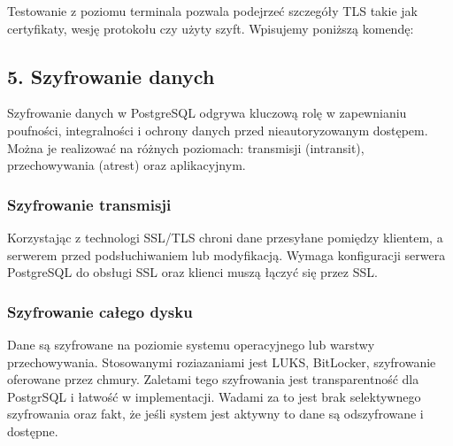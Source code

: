 \documentclass[a4paper,11pt,openany,english]{sphinxmanual}
\begin{document}
\begin{sphinxVerbatim}[commandchars=\\\{\}]
      
 
     
  
\end{sphinxVerbatim}

\sphinxAtStartPar
Testowanie z poziomu terminala pozwala podejrzeć szczegóły TLS takie jak certyfikaty, wesję protokołu czy użyty szyft. Wpisujemy poniższą komendę:

\begin{sphinxVerbatim}[commandchars=\\\{\}]
      
\end{sphinxVerbatim}


\subsection{5. Szyfrowanie danych}
\label{\detokenize{rozdzial2/Bezpieczenstwo/index:szyfrowanie-danych}}
\sphinxAtStartPar
Szyfrowanie danych w PostgreSQL odgrywa kluczową rolę w zapewnianiu poufności, integralności i ochrony danych przed nieautoryzowanym dostępem. Można je realizować na różnych poziomach: transmisji (in\sphinxhyphen{}transit), przechowywania (at\sphinxhyphen{}rest) oraz aplikacyjnym.


\subsubsection{Szyfrowanie transmisji}
\label{\detokenize{rozdzial2/Bezpieczenstwo/index:szyfrowanie-transmisji}}
\sphinxAtStartPar
Korzystając z technologi SSL/TLS chroni dane przesyłane pomiędzy klientem, a serwerem przed podsłuchiwaniem lub modyfikacją. Wymaga konfiguracji serwera PostgreSQL do obsługi SSL oraz klienci muszą łączyć się przez SSL.


\subsubsection{Szyfrowanie całego dysku}
\label{\detokenize{rozdzial2/Bezpieczenstwo/index:szyfrowanie-calego-dysku}}
\sphinxAtStartPar
Dane są szyfrowane na poziomie systemu operacyjnego lub warstwy przechowywania. Stosowanymi roziazaniami jest LUKS, BitLocker, szyfrowanie oferowane przez chmury. Zaletami tego szyfrowania jest transparentność dla PostgrSQL i łatwość w implementacji. Wadami za to jest brak selektywnego szyfrowania oraz fakt, że jeśli system jest aktywny to dane są odszyfrowane i dostępne.
\end{document}
